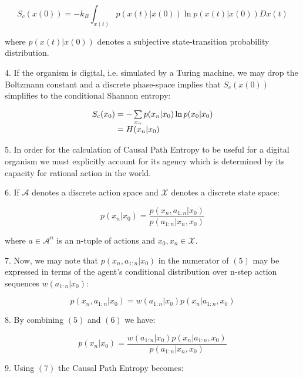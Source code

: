 \documentclass{article}
\begin{document}
\begin{equation}
S_c(x(0))=-k_B \int_{x(t)} p(x(t)|x(0))\ln p(x(t)|x(0)) Dx(t)
\end{equation}

where $p(x(t)|x(0))$ denotes a subjective state-transition probability distribution.

\newpage

4. If the organism is digital, i.e. simulated by a Turing machine, we may drop the Boltzmann constant and a discrete phase-space implies that $S_c(x(0))$ simplifies to the conditional Shannon entropy:


\begin{equation}
\begin{array}{l@{}l}
S_c(x_0) 
    &{}= - \sum\limits_{x_n} p(x_n|x_0)\ln p(x_0|x_0) \\
    &{}= H(x_n|x_0) \\
\end{array}
\end{equation}

5. In order for the calculation of Causal Path Entropy to be useful for a digital organism we must explicitly account for its agency which is determined by its capacity for rational action in the world. 

6. If $\mathcal{A}$ denotes a discrete action space and $\mathcal{X}$ denotes a discrete state space:

\begin{equation}
p(x_n|x_0)= \frac{p(x_n,a_{1:n}|x_0)}{p(a_{1:n}|x_n,x_0)}
\end{equation}

where $a \in \mathcal{A}^n$ is an n-tuple of actions and $x_0,x_n \in \mathcal{X}$.

7. Now, we may note that $p(x_n,a_{1:n}|x_0)$ in the numerator of $(5)$ may be expressed in terms of the agent's conditional distribution over n-step action sequences $w(a_{1:n}|x_0)$:

\begin{equation}
p(x_n,a_{1:n}|x_0)= w(a_{1:n}|x_0)p(x_n|a_{1:n},x_0)
\end{equation}

8. By combining $(5)$ and $(6)$ we have:

\begin{equation}
p(x_n|x_0)= \frac{w(a_{1:n}|x_0)p(x_n|a_{1:n},x_0)}{p(a_{1:n}|x_n,x_0)}
\end{equation}

9. Using $(7)$ the Causal Path Entropy becomes:
\end{document}
